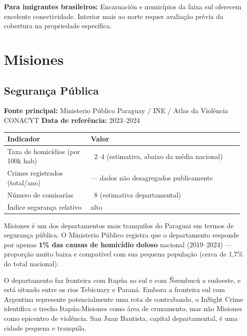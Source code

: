 \textbf{Para imigrantes brasileiros:} Encarnación e municípios da faixa sul oferecem excelente conectividade. Interior mais ao norte requer avaliação prévia da cobertura na propriedade específica.





\clearpage
\section{Misiones}
\label{sec:dept_08_Misiones}

\subsection{Segurança Pública}

\textbf{Fonte principal:} Ministerio Público Paraguay / INE / Atlas da Violência CONACYT
\textbf{Data de referência:} 2023--2024


{\small
\setlength{\tabcolsep}{3pt}
\renewcommand{\arraystretch}{1.12}
\begin{tabularx}{\linewidth}{>{\raggedright\arraybackslash}p{0.34\linewidth} >{\raggedright\arraybackslash}p{0.62\linewidth}}
\toprule
Indicador & Valor \\
\midrule
Taxa de homicídios (por 100k hab) & ~2--4 (estimativa, abaixo da média nacional) \\
Crimes registrados (total/ano) & --- dados não desagregados publicamente \\
Número de comisarías & ~8 (estimativa departamental) \\
Índice segurança relativo & alto \\
\bottomrule
\end{tabularx}
}


Misiones é um dos departamentos mais tranquilos do Paraguai em termos de segurança pública. O Ministerio Público registra que o departamento responde por apenas \textbf{1\% das causas de homicídio doloso} nacional (2019--2024) --- proporção muito baixa e compatível com sua pequena população (cerca de 1,7\% do total nacional).

O departamento faz fronteira com Itapúa ao sul e com Ñeembucú a sudoeste, e está situado entre os rios Tebicuary e Paraná. Embora a fronteira sul com Argentina represente potencialmente uma rota de contrabando, o InSight Crime identifica o trecho Itapúa-Misiones como área de cruzamento, mas não Misiones como epicentro de violência. San Juan Bautista, capital departamental, é uma cidade pequena e tranquila.

